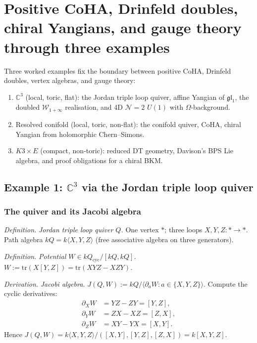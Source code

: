 \section{Positive CoHA, Drinfeld doubles, chiral Yangians, and gauge theory through three examples}
\label{wn:sec:coha-to-W-infty-treatise}

\providecommand{\CoHA}{\mathrm{CoHA}}
\providecommand{\Sh}{\mathrm{Sh}}
\providecommand{\Hilb}{\mathrm{Hilb}}
\providecommand{\Wilpha}{\mathcal{W}_{1+\infty}}
\providecommand{\ChirY}{\mathcal{Y}^{\mathrm{ch}}}
\providecommand{\hCS}{\mathrm{hCS}}
\providecommand{\Conf}{\mathrm{Conf}}
\providecommand{\gghone}{\widehat{\mathfrak{gl}}_1}
\providecommand{\Fact}{\mathrm{Fact}}

Three worked examples fix the boundary between positive CoHA,
Drinfeld doubles, vertex algebras, and gauge theory:
\begin{enumerate}
\item $\mathbb{C}^3$ (local, toric, flat): the Jordan triple loop quiver, affine Yangian
of $\mathfrak{gl}_1$, the doubled $\Wilpha$ realisation, and
4D $\mathcal{N} = 2$ $U(1)$ with $\Omega$-background.
\item Resolved conifold (local, toric, non-flat): the conifold quiver, CoHA, chiral
Yangian from holomorphic Chern--Simons.
\item $K3 \times E$ (compact, non-toric): reduced DT geometry,
Davison's BPS Lie algebra, and proof obligations for a chiral BKM.
\end{enumerate}

\subsection{Example 1: $\mathbb{C}^3$ via the Jordan triple loop quiver}
\label{wn:subsec:jordan-triple}

\subsubsection{The quiver and its Jacobi algebra}

\emph{Definition.} \emph{Jordan triple loop quiver $Q$.}
One vertex $*$; three loops $X, Y, Z: * \to *$.
Path algebra $kQ = k\langle X, Y, Z\rangle$ (free associative algebra on three generators).

\emph{Definition.} \emph{Potential $W \in kQ_{\mathrm{cyc}} / [kQ, kQ]$.}
$W := \mathrm{tr}(X[Y, Z]) = \mathrm{tr}(XYZ - XZY)$.

\emph{Derivation.} \emph{Jacobi algebra.}
$J(Q, W) := kQ / \langle \partial_a W : a \in \{X, Y, Z\}\rangle$.
Compute the cyclic derivatives:
\begin{align}
\partial_X W &= YZ - ZY = [Y, Z],\\
\partial_Y W &= ZX - XZ = [Z, X],\\
\partial_Z W &= XY - YX = [X, Y].
\end{align}
Hence $J(Q, W) = k\langle X, Y, Z\rangle/([X, Y], [Y, Z], [Z, X]) = k[X, Y, Z]$.

